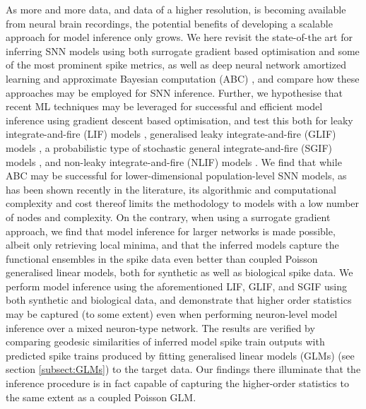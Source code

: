 \documentclass[mphil,deptreport,ianc]{infthesis} %
\begin{document}
As more and more data, and data of a higher resolution, is becoming available from neural brain recordings, the potential benefits of developing a scalable approach for model inference only grows.
We here revisit the state-of-the art for inferring SNN models using both surrogate gradient based optimisation and some of the most prominent spike metrics, as well as deep neural network amortized learning and approximate Bayesian computation (ABC) \cite{Lueckmann2017, Lueckmann2018}, and compare how these approaches may be employed for SNN inference. Further, we hypothesise that recent ML techniques may be leveraged for successful and efficient model inference using gradient descent based optimisation, and test this both for leaky integrate-and-fire (LIF) models \cite{Rolls1998Book, Dayan2001, Paninski2004, Burkitt2006}, generalised leaky integrate-and-fire (GLIF) models \cite{allen_glif_white_paper, Teeter2018a}, a probabilistic type of stochastic general integrate-and-fire (SGIF) models \cite{Rene2020, Schwalger2017}, and non-leaky integrate-and-fire (NLIF) models \cite{Huh2018}.
We find that while ABC may be successful for lower-dimensional population-level SNN models, as has been shown recently in the literature, its algorithmic and computational complexity and cost thereof limits the methodology to models with a low number of nodes and complexity.
On the contrary, when using a surrogate gradient approach, we find that model inference for larger networks is made possible, albeit only retrieving local minima, and that the inferred models capture the functional ensembles in the spike data even better than coupled Poisson generalised linear models, both for synthetic as well as biological spike data.
We perform model inference using the aforementioned LIF, GLIF, and SGIF using both synthetic and biological data, and demonstrate that higher order statistics may be captured (to some extent) even when performing neuron-level model inference over a mixed neuron-type network.
The results are verified by comparing geodesic similarities of inferred model spike train outputs with predicted spike trains produced by fitting generalised linear models (GLMs) (see section \ref{subsect:GLMs}) to the target data.
Our findings there illuminate that the inference procedure is in fact capable of capturing the higher-order statistics to the same extent as a coupled Poisson GLM.
\end{document}
